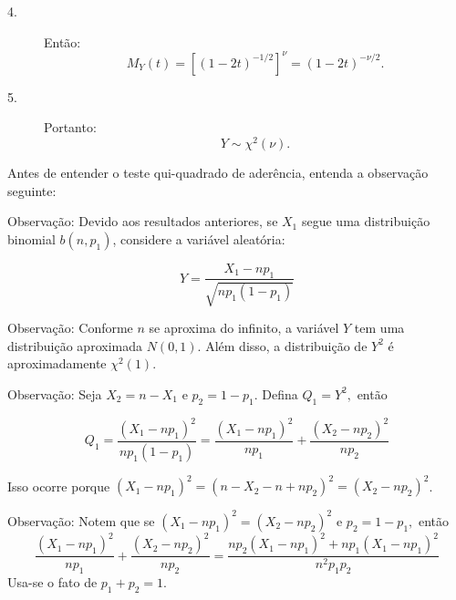 \documentclass[12pt]{beamer}
\begin{document}
\begin{frame}
	\begin{block}{}
\begin{description}
	\item[4.] Então:
	\[
	M_{Y}(t) = \left[(1 - 2t)^{-1/2}\right]^{\nu} = (1 - 2t)^{-\nu/2}.
	\]
	\pause
	\item[5.] Portanto:
	\[
	Y \sim \chi^2(\nu).
	\]
\end{description}
	\end{block}
\end{frame}

\begin{frame}{}
	\begin{block}{}
		\justifying
		Antes de entender o teste qui-quadrado de aderência, entenda a observação seguinte: 
	\end{block}
	\pause
\begin{block}{Observação:}
\justifying
Devido aos resultados anteriores, se $X_1$ segue uma distribuição binomial $b(n, p_1)$, considere a variável aleatória:

\[
Y = \frac{X_1 - np_1}{\sqrt{np_1(1 - p_1)}}
\]
\end{block}
\pause
\begin{block}{Observação:}
\justifying
Conforme $n$ se aproxima do infinito, a variável $Y$ tem uma distribuição aproximada $N(0, 1).$ Além disso, a distribuição de $Y^2$ é aproximadamente $\chi^2(1)$.
\end{block}
\end{frame}

\begin{frame}{}
\begin{block}{Observação:}
\justifying
Seja $X_2 = n - X_1$ e $p_2 = 1 - p_1$. Defina $Q_1=Y^{2},$ então

\[
Q_1 = \frac{(X_1 - np_1)^2}{np_1(1 - p_1)} = \frac{(X_1 - np_1)^2}{np_1} + \frac{(X_2 - np_2)^2}{np_2}
\]

Isso ocorre porque $(X_1 - np_1)^2 = (n - X_2 - n + np_2)^2 = (X_2 - np_2)^2$. 
\end{block}
\pause
\begin{block}{Observação:}
	\justifying
	Notem que se $(X_1 - np_1)^2 = (X_2 - np_2)^2$ e $p_2 = 1 - p_1,$ então 
	\[
	\frac{(X_1 - np_1)^2}{np_1} + \frac{(X_2 - np_2)^2}{np_2}=\frac{np_{2}(X_1 - np_1)^2+np_{1}(X_1 - np_1)^2}{n^{2}p_{1}p_2}
	\]
	Usa-se o fato de $p_{1}+p_{2}=1.$
\end{block}
\end{frame}
\end{document}
